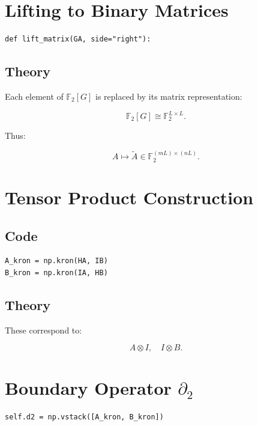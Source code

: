 \documentclass[11pt]{article}
\begin{document}
\section{Lifting to Binary Matrices}

\begin{verbatim}
def lift_matrix(GA, side="right"):
\end{verbatim}

\subsection{Theory}

Each element of $\mathbb{F}_2[G]$ is replaced by its matrix representation:

\begin{equation}
\mathbb{F}_2[G] \cong \mathbb{F}_2^{L \times L}.
\end{equation}

Thus:

\begin{equation}
A \mapsto \widetilde{A} \in \mathbb{F}_2^{(mL) \times (nL)}.
\end{equation}

\section{Tensor Product Construction}

\subsection{Code}
\begin{verbatim}
A_kron = np.kron(HA, IB)
B_kron = np.kron(IA, HB)
\end{verbatim}

\subsection{Theory}

These correspond to:

\begin{equation}
A \otimes I, \quad I \otimes B.
\end{equation}

\section{Boundary Operator $\partial_2$}

\begin{verbatim}
self.d2 = np.vstack([A_kron, B_kron])
\end{verbatim}
\end{document}
